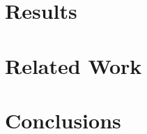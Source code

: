 \documentclass[10pt,article]{IEEEtran}
\begin{document}
\section{Results}

\section{Related Work}

\section{Conclusions}


\IEEEdisplaynontitleabstractindextext


%
\IEEEpeerreviewmaketitle



\end{document}
